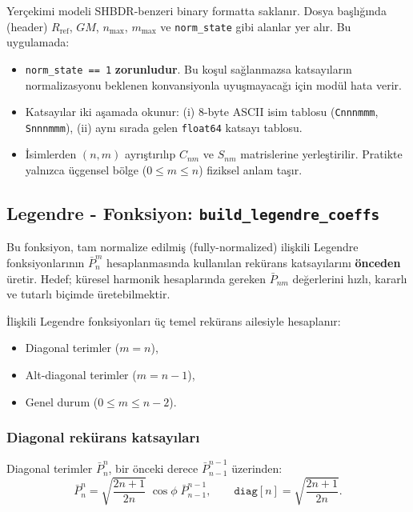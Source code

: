 Yerçekimi modeli SHBDR-benzeri binary formatta saklanır.
Dosya başlığında (header) $R_\text{ref}$, $GM$, $n_\text{max}$, $m_\text{max}$ ve
\texttt{norm\_state} gibi alanlar yer alır. Bu uygulamada:

\begin{itemize}
  \item \texttt{norm\_state == 1} \textbf{zorunludur}.
  Bu koşul sağlanmazsa katsayıların normalizasyonu beklenen konvansiyonla uyuşmayacağı için
  modül hata verir.

  \item Katsayılar iki aşamada okunur:
  (i) 8-byte ASCII isim tablosu (\texttt{Cnnnmmm}, \texttt{Snnnmmm}),
  (ii) aynı sırada gelen \texttt{float64} katsayı tablosu.

  \item İsimlerden $(n,m)$ ayrıştırılıp $C_{nm}$ ve $S_{nm}$ matrislerine yerleştirilir.
  Pratikte yalnızca üçgensel bölge ($0\le m\le n$) fiziksel anlam taşır.
\end{itemize}


\subsection*{Legendre - Fonksiyon: \texttt{build\_legendre\_coeffs}}
\label{subsec:build_legendre_coeffs}

Bu fonksiyon, tam normalize edilmiş (fully-normalized) ilişkili Legendre fonksiyonlarının $\bar{P}_n^m$ hesaplanmasında kullanılan rekürans katsayılarını \textbf{önceden} üretir.
Hedef; küresel harmonik hesaplarında gereken $\bar{P}_{nm}$ değerlerini hızlı, kararlı ve tutarlı biçimde üretebilmektir.

İlişkili Legendre fonksiyonları üç temel rekürans ailesiyle hesaplanır:
\begin{itemize}
  \item Diagonal terimler ($m=n$),
  \item Alt-diagonal terimler ($m=n-1$),
  \item Genel durum ($0 \le m \le n-2$).
\end{itemize}

\subsubsection*{Diagonal rekürans katsayıları}

Diagonal terimler $\bar{P}_n^n$, bir önceki derece $\bar{P}_{n-1}^{n-1}$ üzerinden:
\[
\bar{P}_n^n
=
\sqrt{\frac{2n+1}{2n}}
\;\cos\phi\;
\bar{P}_{n-1}^{n-1},
\qquad
\texttt{diag}[n] = \sqrt{\frac{2n+1}{2n}}.
\]

